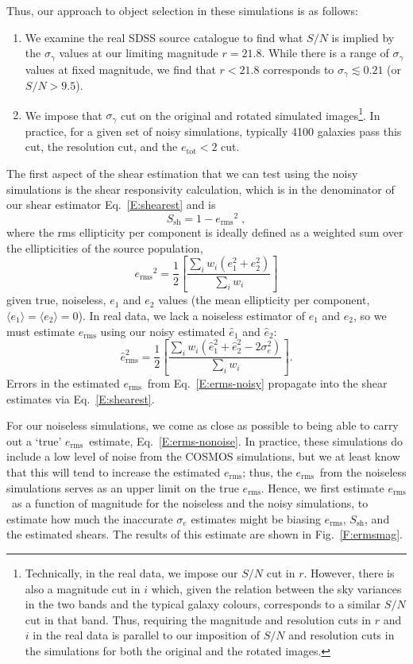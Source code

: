 \documentclass[twocolumn,useAMS,usenatbib]{mn2e}
\newcommand{\beq}{\begin{equation}}
\newcommand{\eeq}{\end{equation}}
\newcommand{\erms}{\ensuremath{e_\mathrm{rms}}}
\newcommand{\etot}{\ensuremath{e_\mathrm{tot}}}
\begin{document}
Thus, our approach to object selection in these simulations %
is as follows:
\begin{enumerate}
\item We examine the real SDSS source catalogue to find what $S/N$ is implied by the
  $\sigma_\gamma$ values at our limiting magnitude $r=21.8$.  While
  there is a range of $\sigma_\gamma$ values at fixed magnitude,
we find
  that $r<21.8$ corresponds to $\sigma_\gamma \lesssim 0.21$  (or $S/N > 9.5$). 
\item We impose that $\sigma_\gamma$ cut on 
  the
  original and rotated simulated images\footnote{Technically, in the real data,
    we impose our $S/N$ cut in $r$.  However, there is also a
    magnitude 
    cut in $i$ which, given the relation between the sky variances in
    the two bands and the typical galaxy colours, corresponds to a
    similar $S/N$ cut in that band.  Thus, requiring the magnitude
    and resolution cuts in $r$ and $i$ in the real data is parallel to
  our imposition of $S/N$ and resolution cuts in the simulations for
  both the original and the rotated images.}.  In practice, for a
given set of noisy simulations, typically 4100 galaxies pass this cut,
the resolution cut, and the $\etot <2$ cut.
\end{enumerate}

The first aspect of the shear estimation that we can test using the
noisy simulations is the shear responsivity calculation, which is in
the denominator of our shear estimator Eq.~\eqref{E:shearest} and is
\beq
S_\mathrm{sh} = {1-\erms^2}\;,
\eeq
where the rms ellipticity per component is ideally defined as a
weighted sum over the ellipticities of the source population, 
\beq\label{E:erms-nonoise}
\erms^2 = \frac{1}{2}\left[\frac{\sum_i w_i (e_1^2 + e_2^2)}{\sum_i w_i}\right]
\eeq
given true, noiseless, $e_1$ and $e_2$ values (the mean ellipticity per component, $\langle e_1\rangle = \langle
e_2\rangle = 0$).  In real data, we lack a noiseless
estimator of $e_1$ and $e_2$, so we must 
estimate $\erms$ using our noisy estimated $\hat{e}_1$ and
$\hat{e}_2$:
\beq\label{E:erms-noisy}
\hat{e}_\mathrm{rms}^2 = \frac{1}{2}\left[\frac{\sum_i w_i
    (\hat{e}_1^2 + \hat{e}_2^2 - 2\sigma_e^2)}{\sum_i w_i}\right].
\eeq
Errors in the estimated \erms\ from
Eq.~\eqref{E:erms-noisy} propagate into the shear estimates via 
Eq.~\eqref{E:shearest}.  

For our noiseless simulations, we come as close as possible to being
able to carry out a `true' \erms\ estimate,
Eq.~\eqref{E:erms-nonoise}.  In practice, these simulations do include
a low level of noise from the COSMOS simulations, but we at least know
that this will tend to increase the estimated \erms; thus, the \erms\
from the noiseless simulations serves as an upper limit on the true
\erms.  Hence, we first estimate \erms\ as a function of
magnitude for the noiseless and the noisy simulations, to estimate how
much the inaccurate $\sigma_e$ estimates might be
biasing \erms, $S_\mathrm{sh}$, and the estimated
shears. The results of this estimate are shown in
Fig.~\ref{F:ermsmag}. 
\end{document}
